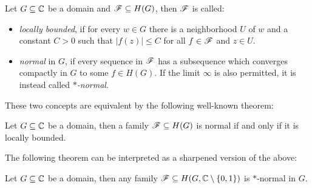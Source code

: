 \begin{definition} \label{def:normal-family}
    Let $G \subseteq \mathbb{C}$ be a domain and $\mathscr{F} \subseteq H(G)$, then $\mathscr{F}$ is called:
    \begin{itemize}
        \item \emph{locally bounded}, if for every $w \in G$ there is a neighborhood $U$ of $w$ and a constant $C > 0$ such that $\vert f(z) \vert \leq C$ for all $f \in \mathscr{F}$ and $z \in U$.
        \item \emph{normal} in $G$, if every sequence in $\mathscr{F}$ has a subsequence which converges compactly in $G$ to some $f \in H(G)$. If the limit $\infty$ is also permitted, it is instead called \emph{$\ast$-normal}.
    \end{itemize}
\end{definition}

These two concepts are equivalent by the following well-known theorem:

\begin{theorem}[Montel] \label{thm:montel}
    Let $G \subseteq \mathbb{C}$ be a domain, then a family $\mathscr{F} \subseteq H(G)$ is normal if and only if it is locally bounded.
\end{theorem}

The following theorem can be interpreted as a sharpened version of the above:

\begin{theorem} \label{lem:montel-sharpened}
    Let $G \subseteq \mathbb{C}$ be a domain, then any family $\mathscr{F} \subseteq H(G, \mathbb{C} \setminus \{ 0, 1 \})$ is $\ast$-normal in $G$.
\end{theorem}

